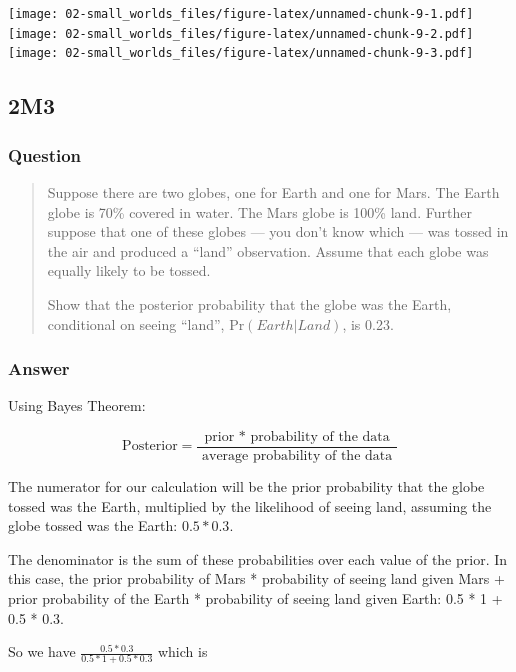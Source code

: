 \documentclass[
]{book}
\begin{document}
\texttt{[image: 02-small\_worlds\_files/figure-latex/unnamed-chunk-9-1.pdf]} \texttt{[image: 02-small\_worlds\_files/figure-latex/unnamed-chunk-9-2.pdf]} \texttt{[image: 02-small\_worlds\_files/figure-latex/unnamed-chunk-9-3.pdf]}

\hypertarget{m3}{%
\subsection*{2M3}\label{m3}}

\hypertarget{question-6}{%
\subsubsection*{Question}\label{question-6}}

\begin{quote}
Suppose there are two globes, one for Earth and one for Mars. The Earth globe is 70\% covered in water. The Mars globe is 100\% land. Further suppose that one of these globes --- you don't know which --- was tossed in the air and produced a ``land'' observation. Assume that each globe was equally likely to be tossed.

Show that the posterior probability that the globe was the Earth, conditional on seeing ``land'', \(\text{Pr}(Earth | Land)\), is 0.23.
\end{quote}

\hypertarget{answer-6}{%
\subsubsection*{Answer}\label{answer-6}}

Using Bayes Theorem:

\[
\text{Posterior} = \frac{\text{ prior * probability of the data }}{\text{ average probability of the data }}
\]

The numerator for our calculation will be the prior probability that the globe tossed was the Earth, multiplied by the likelihood of seeing land, assuming the globe tossed was the Earth: \(0.5 * 0.3\).

The denominator is the sum of these probabilities over each value of the prior. In this case, the prior probability of Mars * probability of seeing land given Mars + prior probability of the Earth * probability of seeing land given Earth: 0.5 * 1 + 0.5 * 0.3.

So we have \(\frac{ 0.5 * 0.3 } { 0.5 * 1 + 0.5 * 0.3 }\) which is
\end{document}
